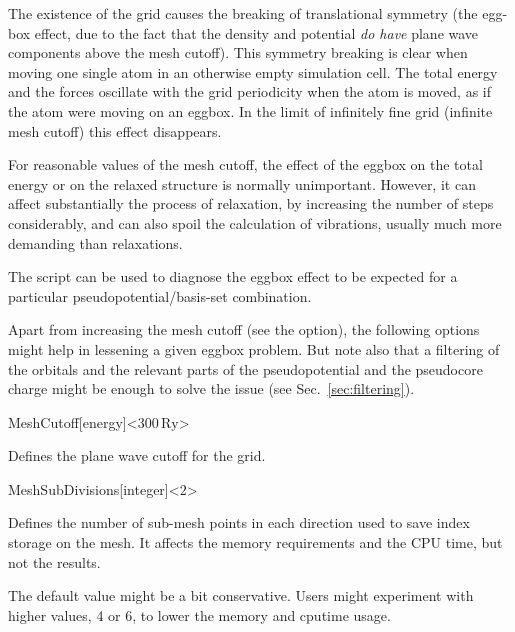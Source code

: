 The existence of the grid causes the breaking of translational
symmetry (the egg-box effect, due to the fact that the density
and potential \emph{do have} plane wave components above
the mesh cutoff).  This symmetry breaking is clear when
moving one single atom in an otherwise empty simulation cell. The
total energy and the forces oscillate with the grid periodicity when
the atom is moved, as if the atom were moving on an eggbox. In the
limit of infinitely fine grid (infinite mesh cutoff) this effect
disappears.

For reasonable values of the mesh cutoff, the effect of the eggbox
on the total energy or on the relaxed structure is normally unimportant.
However, it can affect substantially the process of relaxation, by
increasing the number of steps considerably, and can also spoil the
calculation of vibrations, usually much more demanding than relaxations.

The  script can be used to
diagnose the eggbox effect to be expected for a particular
pseudopotential/basis-set combination.

Apart from increasing the mesh cutoff (see the  option),
the following options might help in lessening a given eggbox problem. But
note also that a filtering of the orbitals and the relevant parts of
the pseudopotential and the pseudocore charge might be enough to solve
the issue (see Sec.~\ref{sec:filtering}).

\begin{fdfentry}{MeshCutoff}[energy]<$300\,\mathrm{Ry}$>

  Defines the plane wave cutoff for the grid.
  
 
\end{fdfentry}

\begin{fdfentry}{MeshSubDivisions}[integer]<$2$>
  
  Defines the number of sub-mesh points in each direction used
  to save index storage on the mesh. It affects the memory
  requirements and the CPU time, but not the results. 

  \note The default value might be a bit conservative. Users might
  experiment with higher values, 4 or 6, to lower the memory and
  cputime usage.

\end{fdfentry}

